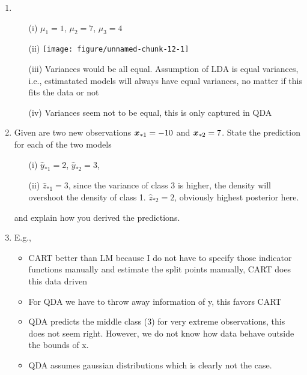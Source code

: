 \documentclass[a4paper]{article}
\makeatletter
\def\maxwidth{ %
  \ifdim\Gin@nat@width>\linewidth
    \linewidth
  \else
    \Gin@nat@width
  \fi
}
\newenvironment{knitrout}{}{} %
\makeatother
\begin{document}
{{\begin{enumerate}
  \item \phantom{foo}
  \begin{enumerate}
    \item[(i)] $\mu_1 = 1$, $\mu_2 = 7$, $\mu_3 = 4$
    \item[(ii)] 
\begin{knitrout}
\color{fgcolor}
\texttt{[image: figure/unnamed-chunk-12-1]} 
\end{knitrout}
    \item[(iii)] Variances would be all equal. Assumption of LDA is equal 
    variances, i.e., estimatated models will always have equal variances, no 
    matter if this fits the data or not
    \item[(iv)] Variances seem not to be equal, this is only captured in QDA
  \end{enumerate}  
  \item Given are two new observations $\bm{x}_{*1} = -10$ and $\bm{x}_{*2} = 7$. 
  State the prediction for each of the two models 
  \begin{enumerate}
    \item[(i)] $\hat{y}_{*1} = 2$, $\hat{y}_{*2} = 3$, 
    \item[(ii)] $\hat{z}_{*1} = 3$, since the variance of class 3 is higher, 
    the density will overshoot the density of class 1. 
    $\hat{z}_{*2} = 2$, obviously highest posterior here.
  \end{enumerate}
  and explain how you derived the predictions.
  \item E.g., 
  \begin{itemize}
    \item CART better than LM because I do not have to specify those indicator 
    functions manually and estimate the split points manually, CART does this 
    data driven
    \item For QDA we have to throw away information of y, this favors CART
    \item QDA predicts the middle class (3) for very extreme observations, this 
    does not seem right. However, we do not know how data behave outside the 
    bounds of x.
    \item QDA assumes gaussian distributions which is clearly not the case.
  \end{itemize}
\end{enumerate}

}

}
\end{document}
